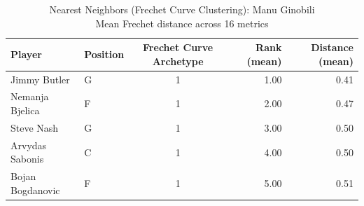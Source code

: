 \begin{table}[t]
\caption*{
{\fontsize{20}{25} Nearest Neighbors (Frechet Curve Clustering): Manu Ginobili\fontsize{12}{15}\selectfont } \\ 
{\fontsize{14}{17}\selectfont  Mean Frechet distance across 16 metrics\fontsize{12}{15}\selectfont }
} 
\fontsize{12.0pt}{14.0pt}\selectfont
\begin{tabular*}{\linewidth}{@{\extracolsep{\fill}}llcrr}
\toprule
Player & Position & Frechet Curve Archetype & Rank (mean) & Distance (mean) \\ 
\midrule\addlinespace[2.5pt]
Jimmy Butler & G & 1 & 1.00 & 0.41 \\ 
Nemanja Bjelica & F & 1 & 2.00 & 0.47 \\ 
Steve Nash & G & 1 & 3.00 & 0.50 \\ 
Arvydas Sabonis & C & 1 & 4.00 & 0.50 \\ 
Bojan Bogdanovic & F & 1 & 5.00 & 0.51 \\ 
\bottomrule
\end{tabular*}
\end{table}

